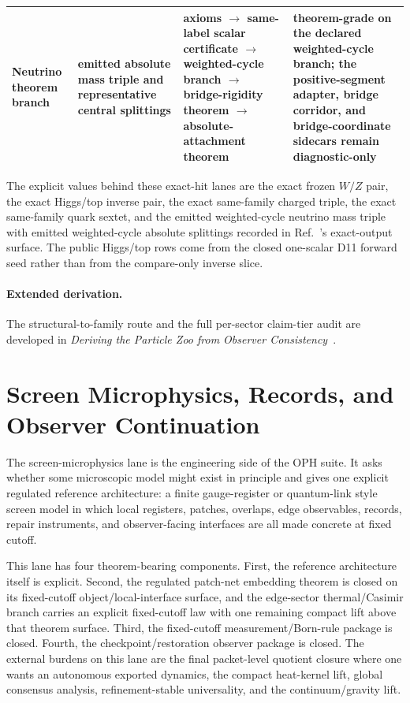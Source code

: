 \begin{table}[h]
\begin{tabular}{@{}>{\raggedright\arraybackslash}p{}>{\raggedright\arraybackslash}p{}>{\raggedright\arraybackslash}p{}>{\raggedright\arraybackslash}p{}@{}}
Neutrino theorem branch & emitted absolute mass triple and representative central splittings & axioms \(\rightarrow\) same-label scalar certificate \(\rightarrow\) weighted-cycle branch \(\rightarrow\) bridge-rigidity theorem \(\rightarrow\) absolute-attachment theorem & theorem-grade on the declared weighted-cycle branch; the positive-segment adapter, bridge corridor, and bridge-coordinate sidecars remain diagnostic-only \\
\bottomrule
\end{tabular}
\end{table}

\noindent The explicit values behind these exact-hit lanes are the exact frozen
\(W/Z\) pair, the exact Higgs/top inverse pair, the exact same-family charged triple,
the exact same-family quark sextet, and the emitted weighted-cycle neutrino mass triple
with emitted weighted-cycle absolute splittings recorded in Ref.~\cite{ophparticles}'s exact-output surface. The public Higgs/top rows come from the closed one-scalar D11 forward seed rather than from the compare-only inverse slice.

\paragraph{Extended derivation.}
The structural-to-family route and the full per-sector claim-tier audit are developed in
\emph{Deriving the Particle Zoo from Observer Consistency}~\cite{ophparticles}.

\section{Screen Microphysics, Records, and Observer Continuation}

The screen-microphysics lane is the engineering side of the OPH suite. It asks
whether some microscopic model might exist in principle and gives one explicit regulated
reference architecture: a finite gauge-register or quantum-link style screen model in which local
registers, patches, overlaps, edge observables, records, repair instruments, and observer-facing
interfaces are all made concrete at fixed cutoff.

This lane has four theorem-bearing components. First, the reference architecture itself is
explicit. Second, the regulated patch-net embedding theorem is closed on its fixed-cutoff
object/local-interface surface, and the edge-sector thermal/Casimir branch carries an explicit
fixed-cutoff law with one remaining compact lift above that theorem surface.
Third, the fixed-cutoff measurement/Born-rule package is closed. Fourth, the
checkpoint/restoration observer package is closed. The external burdens on this lane are the final
packet-level quotient closure where one wants an autonomous exported dynamics, the compact
heat-kernel lift, global consensus analysis, refinement-stable universality, and the
continuum/gravity lift.

